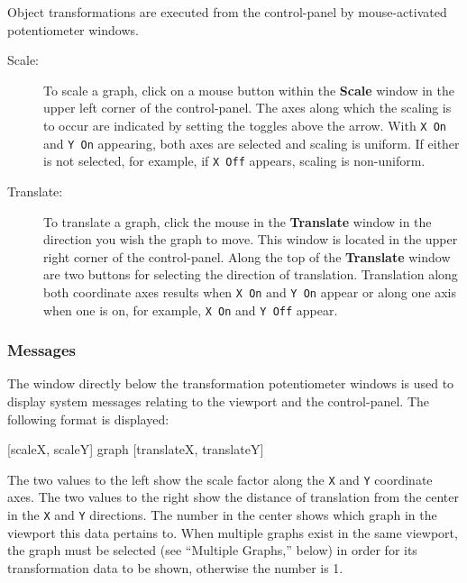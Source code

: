 Object transformations are executed from the control-panel by mouse-activated
potentiometer windows.
%
\begin{description}
%
\item[Scale:] To scale a graph, click on a mouse button
within the {\bf Scale} window in the upper left corner of the control-panel.
The axes along which the scaling is to occur are indicated by setting the
toggles above the arrow.
With {\tt X On} and {\tt Y On} appearing, both axes are selected and scaling
is uniform.
If either is not selected, for example, if {\tt X Off} appears, scaling is
non-uniform.
%
\item[Translate:] To translate a graph, click the mouse in the
{\bf Translate} window in the direction you wish the graph to move.
This window is located in the upper right corner of the control-panel.
Along the top of the {\bf Translate} window are two buttons for selecting
the direction of translation.
Translation along both coordinate axes results when {\tt X On} and {\tt Y
On} appear or along one axis when one is on, for example, {\tt X On} and
{\tt Y Off} appear.
\end{description}

\subsubsection{Messages}

The window directly below the transformation potentiometer windows is
used to display system messages relating to the viewport and the control-panel.
The following format is displayed: \newline
%
\begin{center}
[scaleX, scaleY] \spad{>}graph\spad{<} [translateX, translateY] \newline
\end{center}
The two values to the left show the scale factor along the {\tt X} and
{\tt Y} coordinate axes.  The two values to the right show the distance of
translation from the center in the {\tt X} and {\tt Y} directions.  The number
in the center shows which graph in the viewport this data pertains to.
When multiple graphs exist in the same viewport,
the graph must be selected (see ``Multiple Graphs,'' below) in
order for its transformation data to be shown, otherwise the number
is 1.

